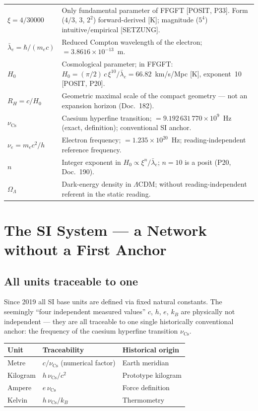 \medskip
\begin{tabular}{@{}lp{10.5cm}}
$\xi = 4/30000$
  & Only fundamental parameter of FFGFT [POSIT, P33].
    Form ($4/3$, $3$, $2^2$) forward-derived [K];
    magnitude ($5^4$) intuitive/empirical [SETZUNG]. \\[4pt]
$\bar\lambda_e = \hbar/(m_e c)$
  & Reduced Compton wavelength of the electron;
    $= 3.8616\times10^{-13}$~m. \\[4pt]
$H_0$
  & Cosmological parameter; in FFGFT:
    $H_0 = (\pi/2)\,c\,\xi^{10}/\bar\lambda_e = 66.82$~km/s/Mpc
    [K], exponent~10 [POSIT, P20]. \\[4pt]
$R_H = c/H_0$
  & Geometric maximal scale of the compact geometry —
    not an expansion horizon (Doc.~182). \\[4pt]
$\nu_\text{Cs}$
  & Caesium hyperfine transition; $= 9.192\,631\,770\times10^9$~Hz
    (exact, definition); conventional SI anchor. \\[4pt]
$\nu_e = m_e c^2/h$
  & Electron frequency; $= 1.235\times10^{20}$~Hz;
    reading-independent reference frequency. \\[4pt]
$n$
  & Integer exponent in $H_0 \propto \xi^n/\bar\lambda_e$;
    $n = 10$ is a posit (P20, Doc.~190). \\[4pt]
$\Omega_\Lambda$
  & Dark-energy density in $\Lambda$CDM;
    without reading-independent referent in the static reading. \\
\end{tabular}

\chapter{The SI System — a Network without a First Anchor}

\section{All units traceable to one}

Since 2019 all SI base units are defined via fixed natural constants.
The seemingly ``four independent measured values'' $c$, $h$, $e$,
$k_B$ are physically not independent — they are all traceable to one
single historically conventional anchor: the frequency of the caesium
hyperfine transition $\nu_\text{Cs}$.

\begin{center}
\begin{tabular}{lll}
\toprule
Unit & Traceability & Historical origin \\
\midrule
Metre    & $c/\nu_\text{Cs}$ (numerical factor) & Earth meridian \\
Kilogram & $h\,\nu_\text{Cs}/c^2$ & Prototype kilogram \\
Ampere   & $e\,\nu_\text{Cs}$ & Force definition \\
Kelvin   & $h\,\nu_\text{Cs}/k_B$ & Thermometry \\
\bottomrule
\end{tabular}
\end{center}


